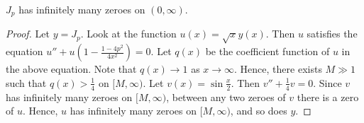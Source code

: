 \begin{lemma}
    $J_{p}$ has infinitely many zeroes on $(0,\infty)$.
\end{lemma}
\begin{proof}
    Let $y = J_{p}$. Look at the function $u(x) = \sqrt{x} y(x)$. Then $u$ satisfies the equation $u'' + u \left( 1 - \frac{1-4p^{2}}{4x^{2}} \right) = 0$. Let $q(x)$ be the coefficient function of $u$ in the above equation. Note that $q(x) \to 1$ as $x \to \infty$. Hence, there exists $M \gg 1$ such that $q(x) > \frac{1}{4}$ on $[M,\infty)$. Let $v(x) = \sin \frac{x}{2}$. Then $v'' + \frac{1}{4} v = 0$. Since $v$ has infinitely many zeroes on $[M,\infty)$, between any two zeroes of $v$ there is a zero of $u$. Hence, $u$ has infinitely many zeroes on $[M,\infty)$, and so does $y$.
\end{proof}

